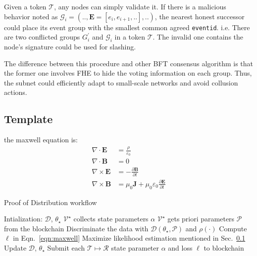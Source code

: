\documentclass[11pt]{article}
\begin{document}
Given a token $\mathcal{T}$, any nodes can simply validate it.
If there is a malicious behavior noted as \( \mathcal{G}_{i} = (.., \mathbf{E} = [e_{i}, e_{i+1}, ..], ..) \), the nearest honest successor could place its event group with the smallest common agreed \texttt{eventid}.
i.e. There are two conflicted groups $G_{i}^{\prime}$ and $\mathcal{G}_{i}$ in a token $\mathcal{T}$. The invalid one contains the node's signature could be used for slashing.


The difference between this procedure and other BFT consensus algorithm is that the former one involves FHE to hide the voting information on each group.
Thus, the subnet could efficiently adapt to small-scale networks and avoid collusion actions.

\subsection{Template}
\label{sec:template}
the maxwell equation is:
\begin{equation}
  \label{eqn:maxwell}
\begin{aligned}
\nabla\cdot\mathbf{E} &= \frac{\rho}{\varepsilon_0}\\
\nabla\cdot\mathbf{B} &= 0\\
\nabla\times\mathbf{E} &= -\frac{\partial\mathbf{B}}{\partial t}\\
\nabla\times\mathbf{B} &= \mu_0\mathbf{J}+\mu_0\varepsilon_0\frac{\partial\mathbf{E}}{\partial t}
\end{aligned}
\end{equation}
\begin{algorithm}
	\caption{Proof of Distribution workflow}\label{alg:pod}
	\begin{algorithmic}[1]
		\State Intialization: $\mathcal{D}$, $\theta_\star$
			\State $\mathcal{V^\star}$ collects state parameters $\alpha$
			\State $\mathcal{V^\star}$ gets priori parameters $\mathcal{P}$ from the blockchain
			\Repeat 
				\State Discriminate the data with $\mathcal{D}(\theta_\star, \mathcal{P})$ and $\rho(\cdot)$
				\State Compute $\ell$ in Eqn.~\ref{eqn:maxwell}
				\State Maximize likelihood estimation mentioned in Sec.~\ref{sec:template}
				\State Update $\mathcal{D}$, $\theta_\star$
			\Until {$\delta \ell<\theta_\epsilon$}
			\State Submit each $\mathcal{T}\mapsto\mathcal{R}$ state parameter $\alpha$ and loss $\ell$ to blockchain
		\EndFor
	\end{algorithmic}
  \end{algorithm}


\end{document}
